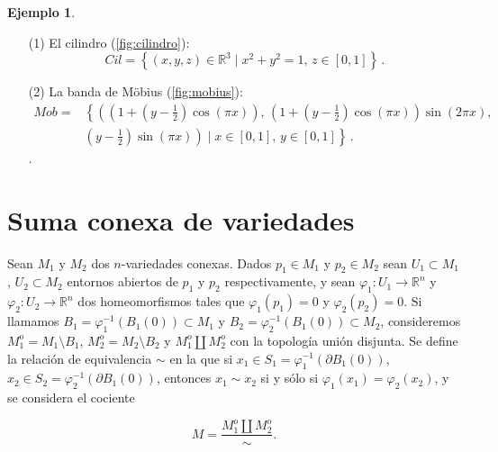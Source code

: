 \documentclass[10pt]{report}
\newcommand{\R}{\mathbb{R}}
\theoremstyle{definition}
\newtheorem{eje}[defin]{Ejemplo}
\begin{document}
\begin{eje}\label{eje:rep_borde}
\begin{itemize}
\item[(1)] El cilindro  (\autoref{fig:cilindro}): $$Cil=\left\{(x,y,z)\in \R^3 \mid x^2+y^2=1,\, z\in \left[ 0,1\right] \right\} \,.$$
\item[(2)] La banda de Möbius (\autoref{fig:mobius}):
\begin{align*}
Mob=
& \left\{ \left(\left(1+\left(y-\frac{1}{2}\right)\cos \left(\pi x\right)\right), \, \left(1+\left(y-\frac{1}{2}\right)\cos \left(\pi x\right)\right)\sin \left( 2 \pi x\right), \right. \right.\\
& \left. \left. \left( y-\frac{1}{2} \right)\sin \left( \pi x\right)\right) \mid x\in \left[0,1\right], \, y\in \left[0,1\right] \right\} \, .
\end{align*}.
\end{itemize}
\end{eje}

\section{Suma conexa de variedades}
Sean $M_1$ y $M_2$ dos $n$-variedades conexas. Dados $p_1\in M_1$ y $p_2\in M_2$ sean $U_1\subset M_1$, $U_2\subset M_2$  entornos abiertos de $p_1$ y $p_2$ respectivamente, y sean $\varphi_1:U_1\to\R^n$ y $\varphi_2:U_2\to\R^n$ dos homeomorfismos tales que $\varphi_1(p_1)=0$ y $\varphi_2(p_2)=0$. Si llamamos $B_1=\varphi_1^{-1}(B_1(0))\subset M_1$ y $B_2=\varphi_2^{-1}(B_1(0))\subset M_2$, consideremos $M_1^o=M_1\setminus B_1$, $M_2^o=M_2\setminus B_2$ y $M_1^o \amalg M_2^o$ con la topología unión disjunta.
Se define la relación de equivalencia $\sim$ en la que si $x_1\in S_1=\varphi_1^{-1}(\partial B_1(0))$, $x_2\in S_2=\varphi_2^{-1}(\partial B_1(0))$, entonces $x_1\sim x_2$ si y sólo si $\varphi_1(x_1)=\varphi_2(x_2)$, y se considera el cociente 

$$M=\frac{M_1^o\amalg M_2^o}{\sim}.$$
\end{document}
